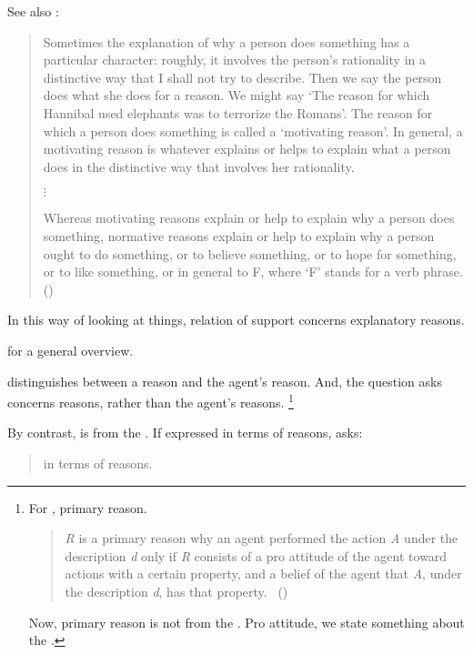 \begin{note}
{    See also \citeauthor{Broome:2013aa}:
    \begin{quote}
      Sometimes the explanation of why a person does something has a particular character:
      roughly, it involves the person's rationality in a distinctive way that I shall not try to describe.
      Then we say the person does what she does for a reason.
      We might say ‘The reason for which Hannibal used elephants was to terrorize the Romans'.
      The reason for which a person does something is called a ‘motivating reason'.
      In general, a motivating reason is whatever explains or helps to explain what a person does in the distinctive way that involves her rationality.

      \mbox{}\hfill\(\vdots\)\hfill\mbox{}

      Whereas motivating reasons explain or help to explain why a person does something, normative reasons explain or help to explain why a person ought to do something, or to believe something, or to hope for something, or to like something, or in general to F, where ‘F' stands for a verb phrase.%
      \mbox{}\hfill\mbox{(\citeyear[46--47]{Broome:2013aa})}
    \end{quote}

    In this way of looking at things, relation of support concerns explanatory reasons.

    \textcite{Hieronymi:2011aa} for a general overview.
  }
  \citeauthor{Davidson:1963aa} distinguishes between a reason and the agent's reason.
  And, the question \citeauthor{Davidson:1963aa} asks concerns reasons, rather than the agent's reasons.%
  \footnote{
    For \citeauthor{Davidson:1963aa}, primary reason.

    \begin{quote}
      \emph{R} is a primary reason why an agent performed the action \emph{A} under the description \emph{d} only if \emph{R} consists of a pro attitude of the agent toward actions with a certain property, and a belief of the agent that \emph{A}, under the description \emph{d}, has that property.\newline
      \mbox{ }\hfill\mbox{(\citeyear[687]{Davidson:1963aa})}
    \end{quote}
    Now, primary reason is not from the \agpe{}.
    Pro attitude, we state something about the \agpe{}.
  }

  By contrast, \qWhy{} is from the \agpe{}.
  If expressed in terms of reasons, \qWhy{} asks:

  \begin{quote}
    \color{red}
    \qWhy{} in terms of reasons.
  \end{quote}


\end{note}
